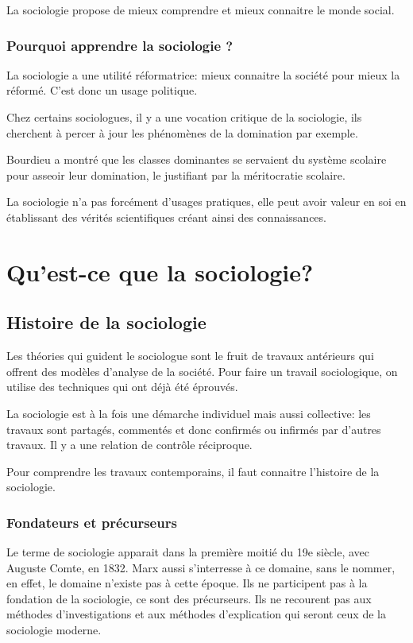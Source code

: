﻿\documentclass[12pt, a4paper, openany]{book}
\begin{document}
La sociologie propose de mieux comprendre et mieux connaitre le monde social.

	\section{Pourquoi apprendre la sociologie ?}

La sociologie a une utilité réformatrice: mieux connaitre la société pour mieux la réformé. C'est donc un usage politique. 

Chez certains sociologues, il y a une vocation critique de la sociologie, ils cherchent à percer à jour les phénomènes de la domination par exemple.

Bourdieu a montré que les classes dominantes se servaient du système scolaire pour asseoir leur domination, le justifiant par la méritocratie scolaire.

La sociologie n'a pas forcément d'usages pratiques, elle peut avoir valeur en soi en établissant des vérités scientifiques créant ainsi des connaissances.

\part{Qu'est-ce que la sociologie?}
\chapter{Histoire de la sociologie}

Les théories qui guident le sociologue sont le fruit de travaux antérieurs qui offrent des modèles d'analyse de la société. Pour faire un travail sociologique, on utilise des techniques qui ont déjà été éprouvés.

La sociologie est à la fois une démarche individuel mais aussi collective: les travaux sont partagés, commentés et donc confirmés ou infirmés par d'autres travaux. Il y a une relation de contrôle réciproque.

Pour comprendre les travaux contemporains, il faut connaitre l'histoire de la sociologie.

\section{Fondateurs et précurseurs}

Le terme de sociologie apparait dans la première moitié du 19e siècle, avec Auguste Comte, en 1832. Marx aussi s'interresse à ce domaine, sans le nommer, en effet, le domaine n'existe pas à cette époque. Ils ne participent pas à la fondation de la sociologie, ce sont des précurseurs. Ils ne recourent pas aux méthodes d'investigations et aux méthodes d'explication qui seront ceux de la sociologie moderne.
\end{document}
